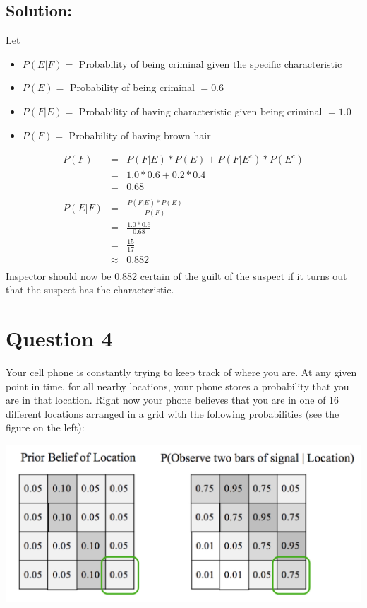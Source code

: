 \documentclass[12pt]{article}%
\begin{document}
\subsection*{Solution:}
Let 
\begin{itemize}
\item $P(E|F) =$ Probability of being criminal given the specific characteristic
\item $P(E) =$ Probability of being criminal $= 0.6$
\item $P(F|E) =$ Probability of having characteristic given being criminal $= 1.0$
\item 
	$P(F) = $ Probability of having brown hair  
\end{itemize}
\begin{eqnarray*}
P(F) & = & P(F|E) * P(E) + P(F|E^c) * P(E^c) \\
	 & = & 1.0 * 0.6 + 0.2 * 0.4 \\
	 & = & 0.68 \\ \\
P(E|F) & = & \frac{P(F|E) * P(E)}{P(F)} \\
	   & = & \frac{1.0 * 0.6}{0.68} \\
	   & = & \frac{15}{17} \\
	   & \approx & 0.882 \\
\end{eqnarray*} 
Inspector should now be 0.882 certain of the guilt of the suspect if it turns out that the suspect has the characteristic.
\newpage
\section*{Question 4}
Your cell phone is constantly trying to keep track of where you are. At any given point in time, for all nearby locations, your phone stores a probability that you are in that location. Right now your phone believes that you are in one of 16 different locations arranged in a grid with the following probabilities (see the figure on the left):

\includegraphics[scale=0.7]{figure}
\end{document}
